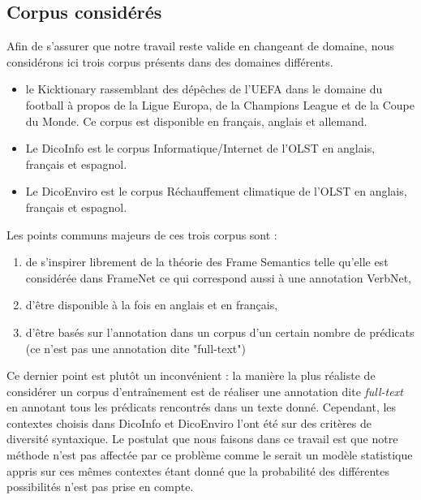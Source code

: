 \subsection{Corpus considérés}

Afin de s'assurer que notre travail reste valide en changeant de domaine, nous
considérons ici trois corpus présents dans des domaines différents.

\begin{itemize}

    \item le Kicktionary \citep{schmidt2009kicktionary} rassemblant des
        dépêches de l'UEFA dans le domaine du football à propos de la Ligue
        Europa, de la Champions League et de la Coupe du Monde. Ce corpus est
        disponible en français, anglais et allemand.

    \item Le DicoInfo est le corpus Informatique/Internet de l'OLST
        \citep{corpusolst} en anglais, français et espagnol.

    \item Le DicoEnviro est le corpus Réchauffement climatique de l'OLST
        \citep{corpusolst} en anglais, français et espagnol.

\end{itemize}

Les points communs majeurs de ces trois corpus sont :
\begin{enumerate}

    \item de s'inspirer librement de la théorie des Frame Semantics telle
        qu'elle est considérée dans FrameNet ce qui correspond aussi à une
        annotation VerbNet,

    \item d'être disponible à la fois en anglais et en français,

    \item d'être basés sur l'annotation dans un corpus d'un certain nombre de
        prédicats (ce n'est pas une annotation dite "full-text")

\end{enumerate}

Ce dernier point est plutôt un inconvénient : la manière la plus réaliste de
considérer un corpus d'entraînement est de réaliser une annotation dite
\textit{full-text} en annotant tous les prédicats rencontrés dans un texte
donné. Cependant, les contextes choisis dans DicoInfo et DicoEnviro l'ont été
sur des critères de diversité syntaxique. \citep{lhomme2012adding} Le postulat
que nous faisons dans ce travail est que notre méthode n'est pas affectée par
ce problème comme le serait un modèle statistique appris sur ces mêmes
contextes étant donné que la probabilité des différentes possibilités n'est pas
prise en compte.

